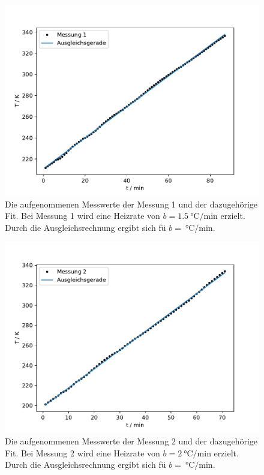 \begin{figure}
  \centering
  \includegraphics{build/zeit_temp_fit_1.pdf}
  \caption{Die aufgenommenen Messwerte der Messung 1 und der dazugehörige Fit. Bei Messung 1 wird eine Heizrate von $b = \SI{1.5}{\celsius\per\minute}$ erzielt.
    Durch die Ausgleichsrechnung ergibt sich fü $b = \SI{}{\celsius\per\minute}$.}
  \label{fig:t_T_plot_1_Ausgleich}
\end{figure} %

\begin{figure}
  \centering
  \includegraphics{build/zeit_temp_fit_2.pdf}
  \caption{Die aufgenommenen Messwerte der Messung 2 und der dazugehörige Fit. Bei Messung 2 wird eine Heizrate von $b = \SI{2}{\celsius\per\minute}$ erzielt.
  Durch die Ausgleichsrechnung ergibt sich fü $b = \SI{}{\celsius\per\minute}$.}
  \label{fig:t_T_plot_2_Ausgleich} 
\end{figure} %

